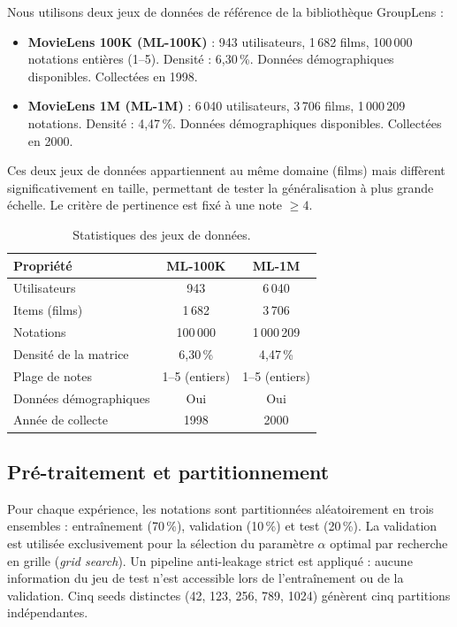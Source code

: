 \documentclass[conference]{IEEEtran}
\begin{document}
Nous utilisons deux jeux de données de référence de la bibliothèque GroupLens :

\begin{itemize}
    \item \textbf{MovieLens 100K (ML-100K)} : 943 utilisateurs, 1\,682 films,
          100\,000 notations entières (1--5). Densité : 6,30\,\%. Données
          démographiques disponibles. Collectées en 1998.
    \item \textbf{MovieLens 1M (ML-1M)} : 6\,040 utilisateurs, 3\,706 films,
          1\,000\,209 notations. Densité : 4,47\,\%. Données démographiques
          disponibles. Collectées en 2000.
\end{itemize}

Ces deux jeux de données appartiennent au même domaine (films) mais diffèrent
significativement en taille, permettant de tester la généralisation à plus
grande échelle. Le critère de pertinence est fixé à une note $\geq 4$.

\begin{table}[!t]
\renewcommand{\arraystretch}{1.2}
\caption{Statistiques des jeux de données.}
\label{tab:datasets}
\centering
\begin{tabular}{@{}lcc@{}}
\toprule
\textbf{Propriété} & \textbf{ML-100K} & \textbf{ML-1M} \\
\midrule
Utilisateurs          & 943        & 6\,040       \\
Items (films)         & 1\,682     & 3\,706       \\
Notations             & 100\,000   & 1\,000\,209  \\
Densité de la matrice & 6,30\,\%   & 4,47\,\%     \\
Plage de notes        & 1--5 (entiers) & 1--5 (entiers) \\
Données démographiques & Oui        & Oui          \\
Année de collecte     & 1998       & 2000         \\
\bottomrule
\end{tabular}
\end{table}

\subsection{Pré-traitement et partitionnement}

Pour chaque expérience, les notations sont partitionnées aléatoirement en
trois ensembles : entraînement (70\,\%), validation (10\,\%) et test (20\,\%).
La validation est utilisée exclusivement pour la sélection du paramètre
$\alpha$ optimal par recherche en grille (\textit{grid search}). Un pipeline
anti-leakage strict est appliqué : aucune information du jeu de test n'est
accessible lors de l'entraînement ou de la validation. Cinq seeds distinctes
(42, 123, 256, 789, 1024) génèrent cinq partitions indépendantes.
\end{document}
